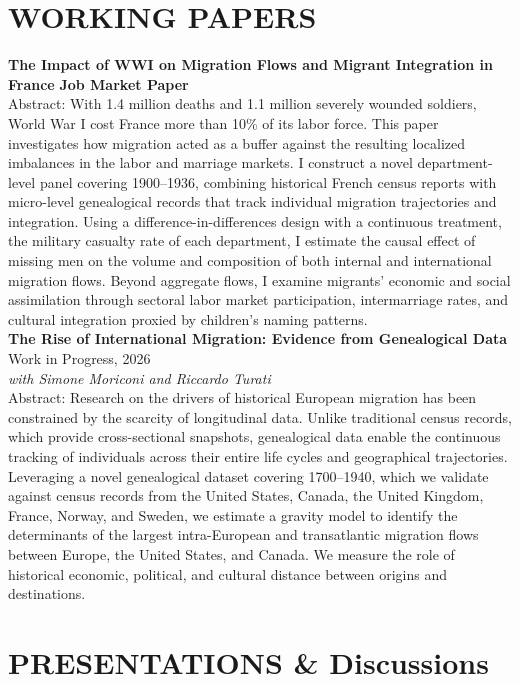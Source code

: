 \documentclass[a4paper,9pt]{extarticle}
\begin{document}
\section*{WORKING PAPERS}

    \noindent
    \textbf{The Impact of WWI on Migration Flows and Migrant Integration in France} \hfill \textbf{Job Market Paper} \\
    Abstract: With 1.4 million deaths and 1.1 million severely wounded soldiers, World War I cost France more than 10\% of its labor force. This paper investigates how migration acted as a buffer against the resulting localized imbalances in the labor and marriage markets. I construct a novel department-level panel covering 1900--1936, combining historical French census reports with micro-level genealogical records that track individual migration trajectories and integration. Using a difference-in-differences design with a continuous treatment, the military casualty rate of each department, I estimate the causal effect of missing men on the volume and composition of both internal and international migration flows. Beyond aggregate flows, I examine migrants' economic and social assimilation through sectoral labor market participation, intermarriage rates, and cultural integration proxied by children's naming patterns. \\

    \noindent
    \textbf{The Rise of International Migration: Evidence from Genealogical Data} \hfill Work in Progress, 2026 \\
    \textit{with Simone Moriconi and Riccardo Turati} \\
    Abstract: Research on the drivers of historical European migration has been constrained by the scarcity of longitudinal data. Unlike traditional census records, which provide cross-sectional snapshots, genealogical data enable the continuous tracking of individuals across their entire life cycles and geographical trajectories. Leveraging a novel genealogical dataset covering 1700--1940, which we validate against census records from the United States, Canada, the United Kingdom, France, Norway, and Sweden, we estimate a gravity model to identify the determinants of the largest intra-European and transatlantic migration flows between Europe, the United States, and Canada. We measure the role of historical economic, political, and cultural distance between origins and destinations.


\section*{PRESENTATIONS \& Discussions}
\end{document}
